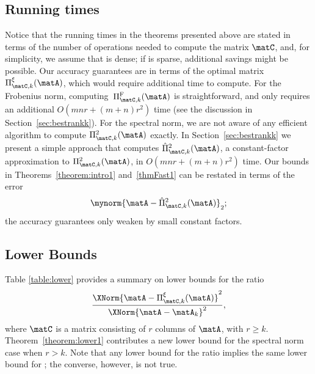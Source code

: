 \subsection{Running times} Notice that the running times in the theorems presented above are stated in terms of the number of
operations needed to compute the matrix $\matC$, and,
for simplicity, we assume that \math{\matA} is dense;
 if \math{\matA} is sparse, additional savings might be possible.
Our accuracy guarantees are in terms of the optimal matrix
$\Pi_{\matC,k}^{\xi}(\matA)$, which would require additional time to compute.
For the Frobenius norm,
computing~$\Pi_{\matC,k}^{\mathrm{F}}(\matA)$ is straightforward,
and only requires an
additional $O\left(mnr + \left(m+n\right)r^2\right)$ time (see the
discussion in Section~\ref{sec:bestrankk}).
For the spectral norm,
we are not aware of any efficient algorithm to compute
$\Pi_{\matC,k}^{2}(\matA)$ exactly.
In Section~\ref{sec:bestrankk} we present a simple approach
that computes $\hat\Pi_{\matC,k}^{2}(\matA)$,
a constant-factor approximation
to $\Pi_{\matC,k}^{2}(\matA)$, in $O\left(mnr + \left(m+n\right)r^2\right)$
time.
Our bounds in Theorems~\ref{theorem:intro1} and~\ref{thmFast1}
can be restated in terms of
the error 
$$\mynorm{\matA-\hat\Pi_{\matC,k}^{2}(\matA)}_2;$$
the accuracy guarantees only weaken by small constant factors.



\subsection{Lower Bounds}
Table \ref{table:lower} provides a summary on lower bounds for the ratio
$$\frac{\XNorm{\matA-\Pi_{\matC,k}^{\xi}(\matA)}^2}{\XNorm{\matA-\matA_k}^2},$$
where $\matC$ is a matrix consisting of $r$ columns of $\matA$, with $r \geq k$. Theorem~\ref{theorem:lower1} contributes a new lower bound for the spectral norm case when $r > k$. Note that any lower bound for the ratio  implies the same lower bound for ; the converse, however, is not true.

